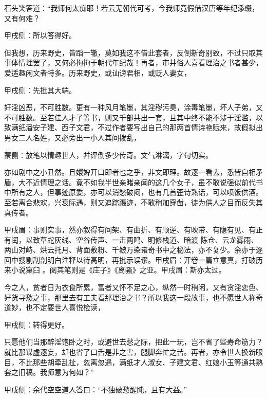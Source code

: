 \begin{parag}
    石头笑答道：“我师何太痴耶！若云无朝代可考，今我师竟假借汉唐等年纪添缀，又有何难？\begin{note}甲戌侧：所以答得好。\end{note}但我想，历来野史，皆蹈一辙，莫如我这不借此套者，反倒新奇别致，不过只取其事体情理罢了，又何必拘拘于朝代年纪哉！再者，市井俗人喜看理治之书者甚少，爱适趣闲文者特多。历来野史，或讪谤君相，或贬人妻女，\begin{note}甲戌侧：先批其大端。\end{note}奸淫凶恶，不可胜数。更有一种风月笔墨，其淫秽污臭，涂毒笔墨，坏人子弟，又不可胜数。至若佳人才子等书，则又千部共出一套，且其中终不能不涉于淫滥，以致满纸潘安子建、西子文君，不过作者要写出自己的那两首情诗艳赋来，故假拟出男女二人名姓，又必旁出一小人其间拨乱，\begin{note}蒙侧：放笔以情趣世人，幷评倒多少传奇。文气淋漓，字句切实。\end{note}亦如剧中之小丑然。且嬛婢开口即者也之乎，非文即理。故逐一看去，悉皆自相矛盾，大不近情理之话。竟不如我半世亲睹亲闻的这几个女子，虽不敢说强似前代书中所有之人，但事迹原委，亦可以消愁破闷，也有几首歪诗熟话，可以喷饭供酒。至若离合悲欢，兴衰际遇，则又追踪蹑迹，不敢稍加穿凿，徒为供人之目而反失其真传者。\begin{note}甲戌眉：事则实事，然亦叙得有间架、有曲折、有顺逆、有映带、有隐有见、有正有闰，以致草蛇灰线、空谷传声、一击两鸣、明修栈道、暗渡 陈仓、云龙雾雨、两山对峙、烘云托月、背面敷粉、千皴万染诸奇书中之秘法，亦不复少。余亦于逐回中搜剔刮剖明白注释以待高明，再批示误谬。甲戌眉：开卷一篇立意真，打破历来小说窠臼 。阅其笔则是《庄子》《离骚》之亚。甲戌眉：斯亦太过。\end{note}今之人，贫者日为衣食所累，富者又怀不足之心，纵然一时稍闲，又有贪淫恋色、好货寻愁之事，那里去有工夫看那理治之书？所以我这一段故事，也不愿世人称奇道妙，也不定要世人喜悦检读，\begin{note}甲戌侧：转得更好。\end{note}只愿他们当那醉淫饱卧之时，或避世去愁之际，把此一玩，岂不省了些寿命筋力？就比那谋虚逐妄，却也省了口舌是非之害，腿脚奔忙之苦。再者，亦令世人换新眼目，不比那些胡牵乱扯，忽离忽遇，满纸才人淑女、子建文君、红娘小玉等通共熟套之旧稿。我师意为何如？”\begin{note}甲戌侧：余代空空道人答曰：“不独破愁醒盹，且有大益。”\end{note}
\end{parag}


